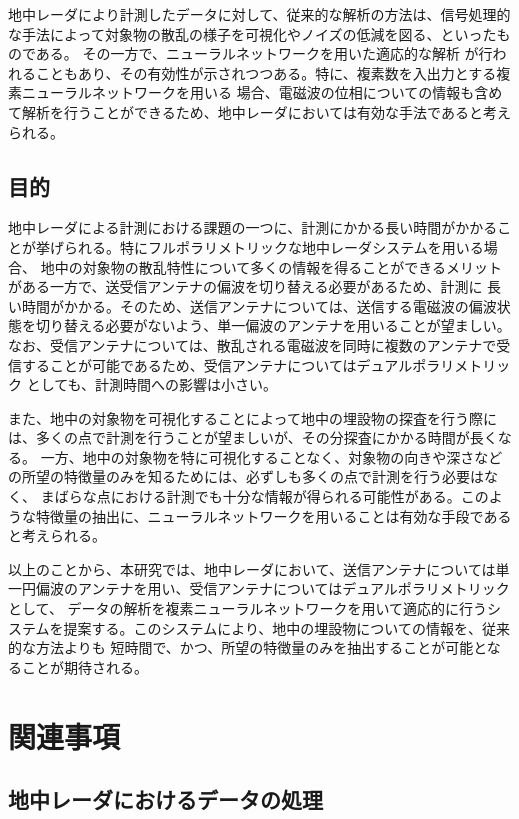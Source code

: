 \documentclass[11pt,a4paper,uplatex]{ujarticle}
\begin{document}
  地中レーダにより計測したデータに対して、従来的な解析の方法は、信号処理的な手法によって対象物の散乱の様子を可視化やノイズの低減を図る、といったものである。
  その一方で、ニューラルネットワークを用いた適応的な解析
  が行われることもあり、その有効性が示されつつある\cite{landmine_CNN}\cite{hidden_Markov}。特に、複素数を入出力とする複素ニューラルネットワークを用いる
  場合、電磁波の位相についての情報も含めて解析を行うことができるため、地中レーダにおいては有効な手法であると考えられる。

  \subsection{目的}\label{sec:purpose}

  地中レーダによる計測における課題の一つに、計測にかかる長い時間がかかることが挙げられる。特にフルポラリメトリックな地中レーダシステムを用いる場合、
  地中の対象物の散乱特性について多くの情報を得ることができるメリットがある一方で、送受信アンテナの偏波を切り替える必要があるため、計測に
  長い時間がかかる。そのため、送信アンテナについては、送信する電磁波の偏波状態を切り替える必要がないよう、単一偏波のアンテナを用いることが望ましい。
  なお、受信アンテナについては、散乱される電磁波を同時に複数のアンテナで受信することが可能であるため、受信アンテナについてはデュアルポラリメトリック
  としても、計測時間への影響は小さい。

  また、地中の対象物を可視化することによって地中の埋設物の探査を行う際には、多くの点で計測を行うことが望ましいが、その分探査にかかる時間が長くなる。
  一方、地中の対象物を特に可視化することなく、対象物の向きや深さなどの所望の特徴量のみを知るためには、必ずしも多くの点で計測を行う必要はなく、
  まばらな点における計測でも十分な情報が得られる可能性がある。このような特徴量の抽出に、ニューラルネットワークを用いることは有効な手段であると考えられる。

  以上のことから、本研究では、地中レーダにおいて、送信アンテナについては単一円偏波のアンテナを用い、受信アンテナについてはデュアルポラリメトリックとして、
  データの解析を複素ニューラルネットワークを用いて適応的に行うシステムを提案する。このシステムにより、地中の埋設物についての情報を、従来的な方法よりも
  短時間で、かつ、所望の特徴量のみを抽出することが可能となることが期待される。


\section{関連事項}

  \subsection{地中レーダにおけるデータの処理}
\end{document}

